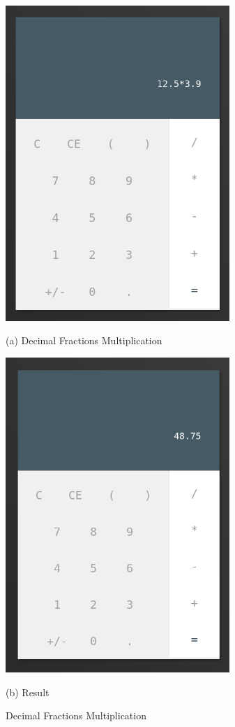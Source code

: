 \documentclass{article}
\begin{document}
\begin{normalsize}
  \begin{figure}[H]
    \begin{minipage}[b]{0.48\linewidth}
      \centering
      \centerline{\includegraphics[width=8.5cm]{dec*}}
      \centerline{ (a) Decimal Fractions Multiplication }\medskip
    \end{minipage}
    \hfill
    \begin{minipage}[b]{0.48\linewidth}
      \centering
      \centerline{\includegraphics[width=8.5cm]{dec*res}}
      \centerline{ (b) Result }\medskip
    \end{minipage}
    \caption{Decimal Fractions Multiplication}
  \end{figure}


\end{normalsize}
\end{document}
